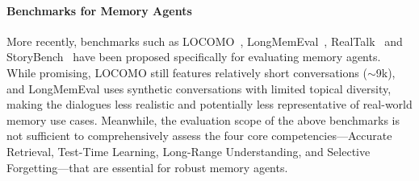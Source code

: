 \paragraph{Benchmarks for Memory Agents}

More recently, benchmarks such as LOCOMO~\citep{locomo}, LongMemEval~\citep{longmemeval}, RealTalk~\citep{Realtalk} and StoryBench~\citep{StoryBench} have been proposed specifically for evaluating memory agents. While promising, LOCOMO still features relatively short conversations ($\sim$9k), and LongMemEval uses synthetic conversations with limited topical diversity, making the dialogues less realistic and potentially less representative of real-world memory use cases. Meanwhile, the evaluation scope of the above benchmarks is not sufficient to comprehensively assess the four core competencies—Accurate Retrieval, Test-Time Learning, Long-Range Understanding, and Selective Forgetting—that are essential for robust memory agents.










